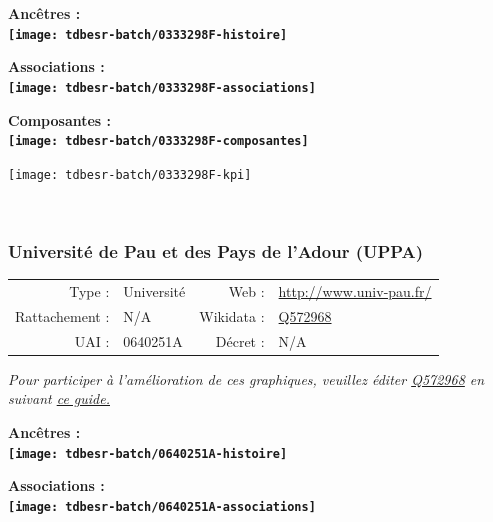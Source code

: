 \documentclass[12pt,french,]{article}
\begin{document}
\vspace{1cm}  
\begin{minipage}[b]{0.50\textwidth}\begin{center} \bf Ancêtres : \\  
\texttt{[image: tdbesr-batch/0333298F-histoire]} \end{center}\end{minipage}\begin{minipage}[b]{0.50\textwidth}\begin{center} \bf Associations : \\  
\texttt{[image: tdbesr-batch/0333298F-associations]} \end{center}\end{minipage}

\hrulefill

\begin{center} \bf Composantes : \\  
\texttt{[image: tdbesr-batch/0333298F-composantes]} \end{center}

\begin{center}\texttt{[image: tdbesr-batch/0333298F-kpi]} \end{center}\checkoddpage

\ifoddpage ~\newpage \fi   

\hypertarget{universituxe9-de-pau-et-des-pays-de-ladour-uppa}{%
\subsubsection{Université de Pau et des Pays de l'Adour
(UPPA)}\label{universituxe9-de-pau-et-des-pays-de-ladour-uppa}}

\begin{tabular*}{\textwidth}{rp{5cm}rl}  
\hline  
Type : & Université & Web : &\href{http://www.univ-pau.fr/}{http://www.univ-pau.fr/} \\  
Rattachement : & N/A & Wikidata : & \href{https://www.wikidata.org/entity/Q572968}{Q572968} \\  
UAI : & 0640251A & Décret : & N/A \\  
\hline  
\end{tabular*}

\textit{\scriptsize Pour participer à l'amélioration de ces graphiques, veuillez éditer  \href{https://www.wikidata.org/entity/Q572968}{Q572968}  en suivant \href{https://github.com/cpesr/wikidataESR/blob/master/Rmd/wikidataESR.md}{ce guide.}}

\vspace{1cm}  
\begin{minipage}[b]{0.50\textwidth}\begin{center} \bf Ancêtres : \\  
\texttt{[image: tdbesr-batch/0640251A-histoire]} \end{center}\end{minipage}\begin{minipage}[b]{0.50\textwidth}\begin{center} \bf Associations : \\  
\texttt{[image: tdbesr-batch/0640251A-associations]} \end{center}\end{minipage}
\end{document}
